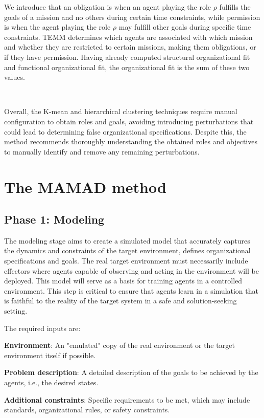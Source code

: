\documentclass[pdflatex,sn-mathphys-num]{sn-jnl}%
\theoremstyle{thmstyleone}%
\theoremstyle{thmstyletwo}%
\theoremstyle{thmstylethree}%
\begin{document}
We introduce that an obligation is when an agent playing the role $\rho$ fulfills the goals of a mission and no others during certain time constraints, while permission is when the agent playing the role $\rho$ may fulfill other goals during specific time constraints.
TEMM determines which agents are associated with which mission and whether they are restricted to certain missions, making them obligations, or if they have permission.
Having already computed structural organizational fit and functional organizational fit, the organizational fit is the sum of these two values.

\

Overall, the K-mean and hierarchical clustering techniques require manual configuration to obtain roles and goals, avoiding introducing perturbations that could lead to determining false organizational specifications. Despite this, the method recommends thoroughly understanding the obtained roles and objectives to manually identify and remove any remaining perturbations.



\section{The MAMAD method}\label{sec:mamad}




\subsection{Phase 1: Modeling}

The modeling stage aims to create a simulated model that accurately captures the dynamics and constraints of the target environment, defines organizational specifications and goals. The real target environment must necessarily include effectors where agents capable of observing and acting in the environment will be deployed. This model will serve as a basis for training agents in a controlled environment. This step is critical to ensure that agents learn in a simulation that is faithful to the reality of the target system in a safe and solution-seeking setting.

The required inputs are:
\begin{enumerate*}[label={\roman*)}]
    \item \textbf{Environment}: An "emulated" copy of the real environment or the target environment itself if possible.
    \item \textbf{Problem description}: A detailed description of the goals to be achieved by the agents, i.e., the desired states.
    \item \textbf{Additional constraints}: Specific requirements to be met, which may include standards, organizational rules, or safety constraints.
\end{enumerate*}
\end{document}
